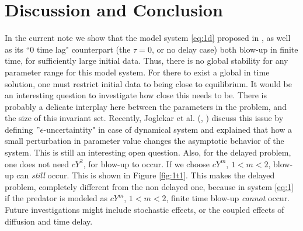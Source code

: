 \documentclass[10pt]{amsart}
\theoremstyle{definition}
\begin{document}
\section{Discussion and Conclusion}
In the current note we show that the model system \eqref{eq:1d} proposed in \cite{RK15}, as well as its ``0 time lag" counterpart (the $\tau=0$, or no delay case) both blow-up in finite time, for sufficiently large initial data. Thus, there is no global stability for any parameter range  for this model system. For there to exist a global in time solution, one must restrict initial data to being close to equilibrium. It would be an interesting question to investigate how close this needs to be. There is probably a delicate interplay here between the parameters in the problem, and the size of this invariant set. Recently, Joglekar et al. (\cite{JYO14}, \cite{JYO15}) discuss this issue by defining $ " \epsilon$-uncertaintity" in case of dynamical system and explained that how a small perturbation in parameter value changes the asymptotic behavior of the system. This is still an interesting open question. Also, for the delayed problem, one does not need $cY^2$, for blow-up to occur. If we choose $cY^m$, $1 <m<2$, blow-up can \emph{still} occur. This is shown in Figure \ref{fig:1t1}. This makes the delayed problem, completely different from the non delayed one, because in system  \eqref{eq:1} if the predator is modeled as $cY^m$, $1 <m<2$, finite time blow-up \emph{cannot} occur. Future investigations might include stochastic effects, or the coupled effects of diffusion and time delay.\\
\end{document}
